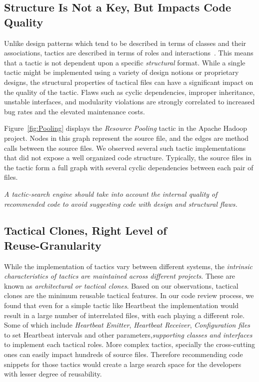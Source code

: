 \subsection{Structure Is Not a Key, But Impacts Code Quality}
Unlike design patterns which tend to be described in terms of classes and their associations, tactics are described in terms of roles and interactions~\cite{bass:arch12}. This means that a tactic is not dependent upon a specific {\em structural} format. While a single tactic might be implemented using a variety of design notions or proprietary designs, the structural properties of tactical files can have a significant impact on the quality of the tactic. Flaws such as cyclic dependencies, improper inheritance, unstable interfaces, and modularity violations are strongly correlated to increased bug rates and the elevated maintenance costs.

Figure~\ref{fig:Pooling} displays the \textit{Resource Pooling} tactic in the Apache Hadoop project. Nodes in this graph represent the source file, and the edges are method calls between the source files. We observed several such tactic implementations that did not expose a well organized code structure. Typically, the source files in the tactic form a full graph with several cyclic dependencies between each pair of files.

\textit{A tactic-search engine should take into account the internal quality of recommended code to avoid suggesting code with design and structural flaws.}


\subsection{Tactical Clones, Right Level of
\\Reuse-Granularity}
While the implementation of tactics vary between different systems, the \textit{intrinsic characteristics of tactics are maintained across different projects}. These are known as \emph{architectural or tactical clones}. Based on our observations, tactical clones are the minimum reusable tactical features. In our code review process, we found that even for a simple tactic like Heartbeat the implementation would result in a large number of interrelated files, with each playing a different role. Some of which include \textit{Heartbeat Emitter}, \textit{Heartbeat Receiver}, \textit{Configuration files} to set Heartbeat intervals and other parameters,\textit{supporting classes and interfaces} to implement each  tactical roles. More complex tactics, specially the cross-cutting ones can easily impact hundreds of source files. Therefore recommending code snippets for those tactics would create a large search space for the developers with lesser degree of reusability.

